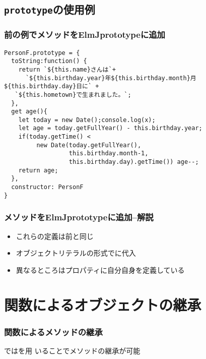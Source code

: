 \begin{frame}[containsverbatim]
 \subsection{\protect\texttt{prototype}の使用例}
\begin{frame}[containsverbatim]
 \frametitle{前の例でメソッドをElmJ{prototype}に追加}
\begin{Verbatim}
PersonF.prototype = {
  toString:function() {
    return `${this.name}さんは`+
      `${this.birthday.year}年${this.birthday.month}月${this.birthday.day}日に` +
   `${this.hometown}で生まれました。`;
  },
  get age(){
    let today = new Date();console.log(x);
    let age = today.getFullYear() - this.birthday.year;
    if(today.getTime() <
         new Date(today.getFullYear(),
                  this.birthday.month-1,
                  this.birthday.day).getTime()) age--;
    return age;
  },
  constructor: PersonF
}
\end{Verbatim}
\end{frame}
\begin{frame}[containsverbatim]
 \frametitle{メソッドをElmJ{prototype}に追加--解説}
 \begin{itemize}
  \item これらの定義は前と同じ
  \item オブジェクトリテラルの形式でに代入
  \item 異なるところはプロパティに自分自身を定義している
 \end{itemize}
\end{frame}

\section{関数によるオブジェクトの継承}
\begin{frame}[containsverbatim]
 \frametitle{関数によるメソッドの継承}
 \JS ではを用
 いることでメソッドの継承が可能


\end{frame}
\end{frame}
